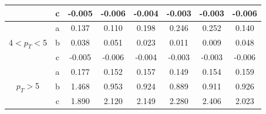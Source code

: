\begin{small}
\begin{center}
\begin{longtable}{c|c|c|c|c|c|c|c}
& c  &-0.005 &-0.006 &-0.004 &-0.003 &-0.003 &-0.006\\ \hline
\multirow{3}{*}{4$< p_T <$5}& a  &0.137 &0.110 &0.198 &0.246 &0.252 &0.140\\
& b  &0.038 &0.051 &0.023 &0.011 &0.009 &0.048\\
& c  &-0.005 &-0.006 &-0.004 &-0.003 &-0.003 &-0.006\\ \hline
\multirow{3}{*}{$ p_T >$5}& a  &0.177 &0.152 &0.157 &0.149 &0.154 &0.159\\
& b  &1.468 &0.953 &0.924 &0.889 &0.911 &0.926\\
& c  &1.890 &2.120 &2.149 &2.280 &2.406 &2.023\\ \hline

\end{longtable}
\end{center}
\end{small}

